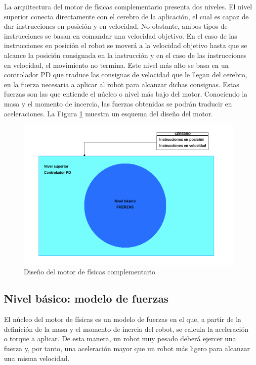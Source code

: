 La arquitectura del motor de físicas complementario presenta dos niveles. El nivel superior conecta directamente con el cerebro de la aplicación, el cual es capaz de dar instrucciones en posición y en velocidad. No obstante, ambos tipos de instrucciones se basan en comandar una velocidad objetivo. En el caso de las instrucciones en posición el robot se moverá a la velocidad objetivo hasta que se alcance la posición consignada en la instrucción y en el caso de las instrucciones en velocidad, el movimiento no termina. Este nivel más alto se basa en un controlador PD que traduce las consignas de velocidad que le llegan del cerebro, en la fuerza necesaria a aplicar al robot para alcanzar dichas consignas. Estas fuerzas son las que entiende el núcleo o nivel más bajo del motor. Conociendo la masa y el momento de incercia, las fuerzas obtenidas se podrán traducir en aceleraciones. La Figura \ref{fig:motor_diseño} muestra un esquema del diseño del motor.

\begin{figure}[h!]
    \centering
    \includegraphics[scale=0.9]{diseño_motor3.png}
    \caption{Diseño del motor de físicas complementario\footnotemark}
    \label{fig:motor_diseño}
\end{figure}

\subsection{Nivel básico: modelo de fuerzas}
El núcleo del motor de físicas es un modelo de fuerzas en el que, a partir de la definición de la masa y el momento de inercia del robot, se calcula la aceleración o torque a aplicar. De esta manera, un robot muy pesado deberá ejercer una fuerza y, por tanto, una aceleración mayor que un robot más ligero para alcanzar una misma velocidad. \newline


